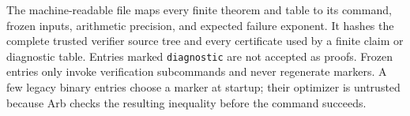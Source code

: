 The machine-readable file  maps every
finite theorem and table to its command, frozen inputs, arithmetic precision,
and expected failure exponent.  It hashes the complete trusted verifier
source tree and every certificate used by a finite claim or diagnostic table.  Entries marked
\texttt{diagnostic} are not accepted as proofs.  Frozen entries only invoke
verification subcommands and never regenerate markers.  A few legacy binary
entries choose a marker at startup; their optimizer is untrusted because Arb
checks the resulting inequality before the command succeeds.
